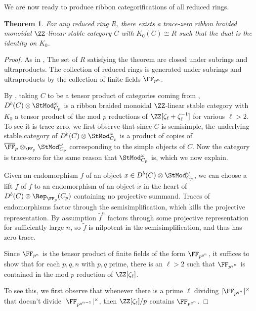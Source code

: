\documentclass[12pt,oneside]{article}
\newcounter{counter}
\newtheorem{thm}[counter]{Theorem}
\begin{document}
We are now ready to produce ribbon categorifications of all reduced rings.

\begin{thm}\label{cor:charp}
	For any reduced ring $R$, there exists a trace-zero ribbon braided monoidal $\ZZ$-linear stable category $C$ with $K_0(C)\cong R$ such that the dual is the identity on $K_0$.
\end{thm}

\begin{proof}
	As in , The set of $R$ satisfying the theorem are closed under subrings and ultraproducts. The collection of reduced rings is generated under subrings and ultraproducts by the collection of finite fields $\FF_{p^n}$.
	
	By , taking $C$ to be a tensor product of categories coming from , $D^b(C)\otimes \StMod^{\omega}_{C_p}$ is a ribbon braided monoidal $\ZZ$-linear stable category with $K_0$ a tensor product of the mod $p$ reductions of $\ZZ[\zeta_\ell+\zeta_{\ell}^{-1}]$ for various $\ell>2$. To see it is trace-zero, we first observe that since $C$ is semisimple, the underlying stable category of $D^b(C)\otimes \StMod^{\omega}_{C_p}$ is a product of copies of $\overline{\FF}_p\otimes_{\FF_p}\StMod^{\omega}_{C_p}$ corresponding to the simple objects of $C$. Now the category is trace-zero for the same reason that $\StMod^{\omega}_{C_p}$ is, which we now explain. 
	
	Given an endomorphism $f$ of an object $x \in D^b(C)\otimes \StMod^{\omega}_{C_p}$, we can choose a lift $\tilde{f}$ of $f$ to an endomorphism of an object $\tilde{x}$ in the heart of $D^b(C)\otimes \Rep_{\FF_p}(C_p)$ containing no projective summand. Traces of endomorphisms factor through the semisimplification, which kills the projective representation. By assumption $\tilde{f}^n$ factors through some projective representation for sufficiently large $n$, so $\tilde{f}$ is nilpotent in the semisimplification, and thus has zero trace.
	
	Since $\FF_{p^n}$ is the tensor product of finite fields of the form $\FF_{p^{q^n}}$, it suffices to show that for each $p,q,n$ with $p,q$ prime, there is an $\ell>2$ such that $\FF_{p^{q^n}}$ is contained in the mod $p$ reduction of $\ZZ[\zeta_\ell]$. 
	
	To see this, we first observe that whenever there is a prime $\ell$ dividing $|\FF_{p^{q^n}}|^\times$ that doesn't divide $|\FF_{p^{q^{n-1}}}|^\times$, then $\ZZ[\zeta_{\ell}]/p$ contains $\FF_{p^{q^n}}$.
	

\end{proof}
\end{document}
